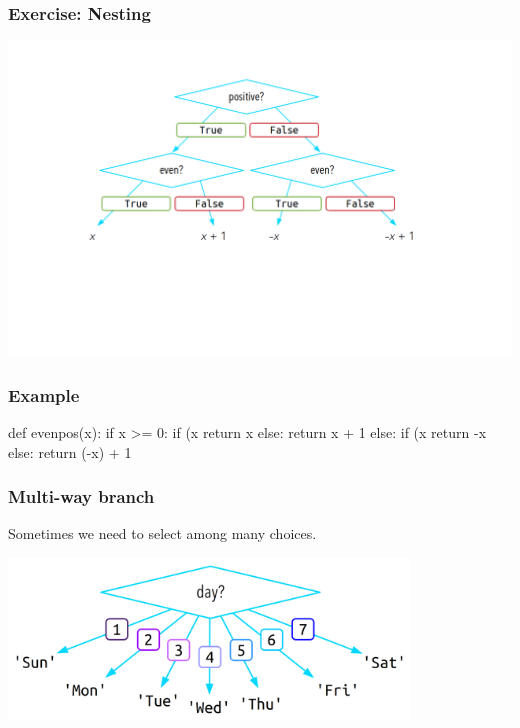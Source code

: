 \documentclass[11pt]{beamer}
\begin{document}
\begin{frame}
  \frametitle{Exercise:  Nesting}
  \includegraphics[width=\textwidth]{./img/control-flow-nesting-else-ex.png}
\end{frame}

\begin{frame}[fragile]
  \frametitle{Example}
  \Enlarge

  \begin{semiverbatim}
  def evenpos(x):
if x >= 0:
    if (x%
        return x
    else:
        return x + 1
else:
    if (x%
        return -x
    else:
        return (-x) + 1
  \end{semiverbatim}
\end{frame}

\begin{frame}[fragile]
  \frametitle{Multi-way branch}
  \Enlarge

  \begin{itemize}
  \myitem  Sometimes we need to select among many choices.
  \end{itemize}
  \includegraphics[width=0.8\textwidth]{./img/control-flow-multi.png}
\end{frame}
\end{document}

